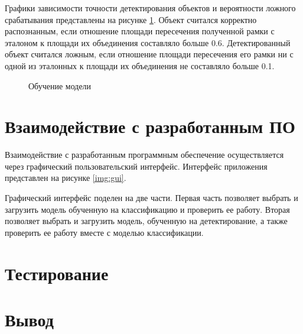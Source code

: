 Графики зависимости точности детектирования объектов и вероятности ложного срабатывания представлены на рисунке \ref{img:yolo_training}. Объект считался корректно распознанным, если отношение площади пересечения полученной рамки с эталоном к площади их объединения составляло больше 0.6. Детектированный объект считался ложным, если отношение площади пересечения его рамки ни с одной из эталонных к площади их объединения не составляло больше 0.1.

\begin{figure}[H]
	\begin{center}
		\caption{Обучение модели}
		\label{img:yolo_training}
	\end{center}
\end{figure}


\section{Взаимодействие с разработанным ПО}

Взаимодействие с разработанным программным обеспечение осуществляется через графический пользовательский интерфейс. Интерфейс приложения представлен на рисунке \ref{img:gui}.


Графический интерфейс поделен на две части. Первая часть позволяет выбрать и загрузить модель обученную на классификацию и проверить ее работу. Вторая позволяет выбрать и загрузить модель, обученную на детектирование, а также проверить ее работу вместе с моделью классификации.

\section{Тестирование}

\section{Вывод}


